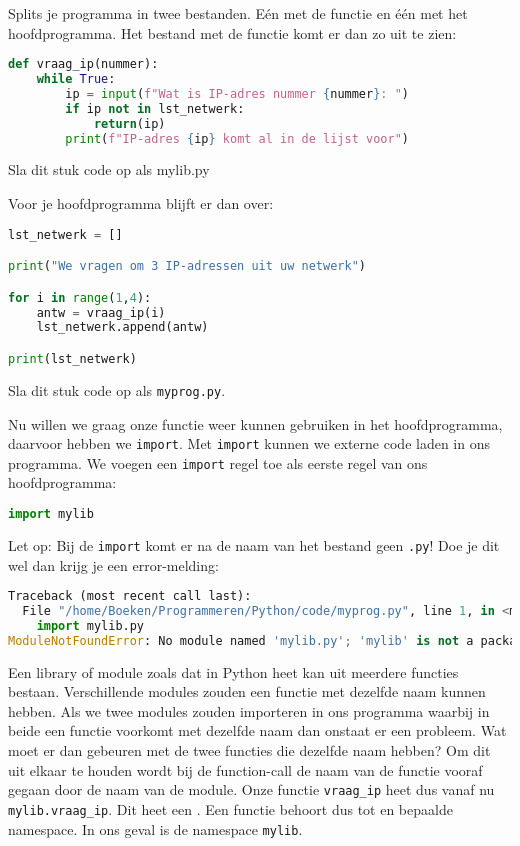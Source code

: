 Splits je programma in twee bestanden. E\'en met de functie en \'e\'en met het hoofdprogramma. Het bestand met de functie komt er dan zo uit te zien:
\begin{lstlisting}[language=python]
def vraag_ip(nummer):
    while True:
        ip = input(f"Wat is IP-adres nummer {nummer}: ")
        if ip not in lst_netwerk:
            return(ip)
        print(f"IP-adres {ip} komt al in de lijst voor")
\end{lstlisting}
Sla dit stuk code op als mylib.py

Voor je hoofdprogramma blijft er dan over:
\begin{lstlisting}[language=python]
lst_netwerk = []

print("We vragen om 3 IP-adressen uit uw netwerk")

for i in range(1,4):
    antw = vraag_ip(i)
    lst_netwerk.append(antw)

print(lst_netwerk)
\end{lstlisting}
Sla dit stuk code op als \texttt{myprog.py}.

Nu willen we graag onze functie weer kunnen gebruiken in het hoofdprogramma, daarvoor hebben we \texttt{import}. Met \texttt{import} kunnen we externe code laden in ons programma. We voegen een \texttt{import} regel toe als eerste regel van ons hoofdprogramma:
\begin{lstlisting}[language=python]
import mylib
\end{lstlisting}
Let op: Bij de \texttt{import} komt er na de naam van het bestand geen \texttt{.py}! Doe je dit wel dan krijg je een error-melding:
\begin{lstlisting}[language=python]
Traceback (most recent call last):
  File "/home/Boeken/Programmeren/Python/code/myprog.py", line 1, in <module>
    import mylib.py
ModuleNotFoundError: No module named 'mylib.py'; 'mylib' is not a package
\end{lstlisting}

Een library of module zoals dat in Python heet kan uit meerdere functies bestaan. Verschillende modules zouden een functie met dezelfde naam kunnen hebben. Als we twee modules zouden importeren in ons programma waarbij in beide een functie voorkomt met dezelfde naam dan onstaat er een probleem. Wat moet er dan gebeuren met de twee functies die dezelfde naam hebben? Om dit uit elkaar te houden wordt bij de function-call de naam van de functie vooraf gegaan door de naam van de module. Onze functie \texttt{vraag\_ip} heet dus vanaf nu \texttt{mylib.vraag\_ip}. Dit heet een . Een functie behoort dus tot en bepaalde namespace. In ons geval is de namespace \texttt{mylib}.

